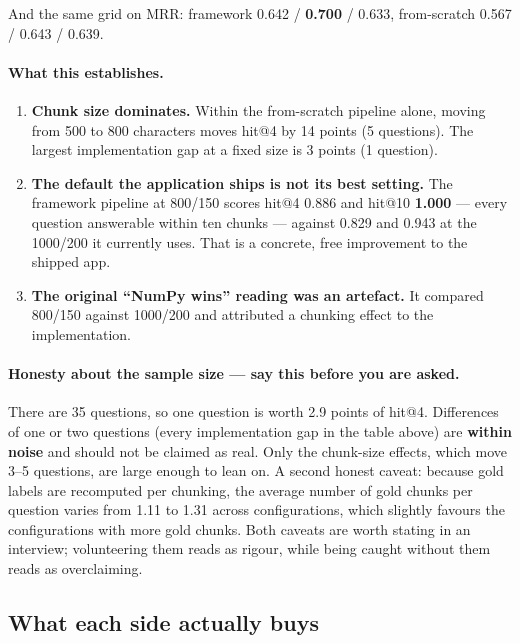 \documentclass[11pt,a4paper]{article}
\begin{document}
\noindent
And the same grid on MRR: framework 0.642 / \textbf{0.700} / 0.633, from-scratch
0.567 / 0.643 / 0.639.

\paragraph{What this establishes.}
\begin{enumerate}
  \item \textbf{Chunk size dominates.} Within the from-scratch pipeline alone,
        moving from 500 to 800 characters moves hit@4 by 14 points (5 questions).
        The largest implementation gap at a fixed size is 3 points (1 question).
  \item \textbf{The default the application ships is not its best setting.}
        The framework pipeline at 800/150 scores hit@4 0.886 and hit@10
        \textbf{1.000} --- every question answerable within ten chunks --- against
        0.829 and 0.943 at the 1000/200 it currently uses. That is a concrete,
        free improvement to the shipped app.
  \item \textbf{The original ``NumPy wins'' reading was an artefact.} It compared
        800/150 against 1000/200 and attributed a chunking effect to the
        implementation.
\end{enumerate}

\paragraph{Honesty about the sample size --- say this before you are asked.}
There are 35 questions, so one question is worth 2.9 points of hit@4. Differences
of one or two questions (every implementation gap in the table above) are
\textbf{within noise} and should not be claimed as real. Only the chunk-size
effects, which move 3--5 questions, are large enough to lean on. A second honest
caveat: because gold labels are recomputed per chunking, the average number of
gold chunks per question varies from 1.11 to 1.31 across configurations, which
slightly favours the configurations with more gold chunks. Both caveats are worth
stating in an interview; volunteering them reads as rigour, while being caught
without them reads as overclaiming.

\subsection{What each side actually buys}
\end{document}
